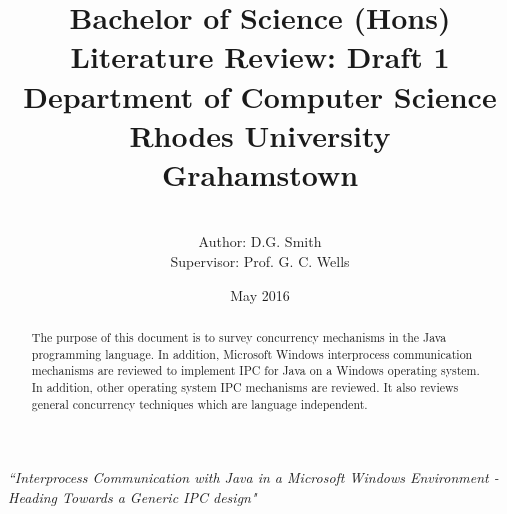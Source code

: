 \documentclass[12pt,a4paper,oneside]{article}
\begin{document}
\pagestyle{fancy}
\fancyhf{}

\title{Bachelor of Science (Hons)
\\Literature Review: Draft 1\\
Department of Computer Science\\Rhodes University\\Grahamstown
}
\author{ 
\\Author: D.G. Smith
\\Supervisor: Prof. G. C. Wells }
\date {May 2016}
\maketitle
\begin{center}
\it{``Interprocess Communication with Java in a Microsoft Windows Environment - Heading Towards a Generic IPC design"}
\end{center}
\begin{abstract}
The purpose of this document is to survey concurrency mechanisms in the Java programming language. In addition, Microsoft Windows interprocess communication mechanisms are reviewed to implement IPC for Java on a Windows operating system. In addition, other operating system IPC mechanisms are reviewed. It also reviews general concurrency techniques which are language independent.
\end{abstract}
\pagebreak
\end{document}
